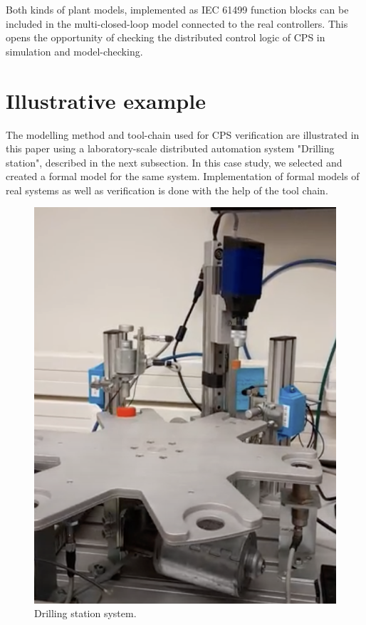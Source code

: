 \begin{bibunit}
Both kinds of plant models, implemented as IEC 61499 function blocks can be included in the multi-closed-loop model connected to the real controllers. This opens the opportunity of checking the distributed control logic of CPS in simulation and model-checking.  

\section{Illustrative example}\label{sec:illustrative_example}

The modelling method and tool-chain used for CPS verification are illustrated in this paper using a laboratory-scale distributed automation system "Drilling station", described in the next subsection. In this case study, we selected and created a formal model for the same system. Implementation of formal models of real systems as well as verification is done with the help of the tool chain. 

\begin{figure}[h]
    \centering
    \includegraphics[scale = 0.2]{MX_Papers/Paper2/images/DT_REAL.png}
    \caption{Drilling station system.}
    \label{figure:RealImageofDrillTable}
\end{figure}


\end{bibunit}
